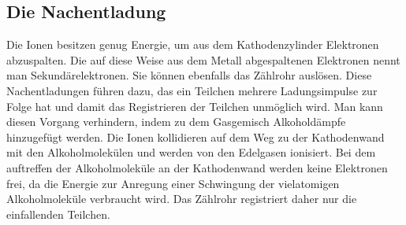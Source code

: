   \subsection{Die Nachentladung}
    Die Ionen besitzen genug Energie, um aus dem Kathodenzylinder Elektronen abzuspalten. Die auf
    diese Weise aus dem Metall abgespaltenen Elektronen nennt man Sekundärelektronen. Sie können
    ebenfalls das Zählrohr auslösen. Diese Nachentladungen führen dazu, das ein Teilchen mehrere
    Ladungsimpulse zur Folge hat und damit das Registrieren der Teilchen unmöglich wird. Man kann
    diesen Vorgang verhindern, indem zu dem Gasgemisch Alkoholdämpfe hinzugefügt werden. Die Ionen
    kollidieren auf dem Weg zu der Kathodenwand mit den Alkoholmolekülen und werden von den Edelgasen
    ionisiert. Bei dem auftreffen der Alkoholmoleküle an der Kathodenwand werden keine Elektronen frei,
    da die Energie zur Anregung einer Schwingung der vielatomigen Alkoholmoleküle verbraucht wird.
    Das Zählrohr registriert daher nur die einfallenden Teilchen.
\label{sec:Theorie}
